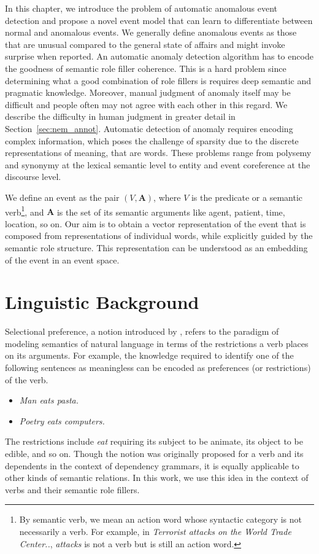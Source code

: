 In this chapter, we introduce the problem of automatic anomalous event
detection and propose a novel event model that can learn to differentiate
between normal
and anomalous events. We generally define anomalous events as those that are
unusual compared
to the general state of affairs and might invoke surprise when reported. An 
automatic
anomaly detection algorithm has to encode
the goodness of semantic role filler coherence.  This is a hard problem since
determining what a good combination of role fillers is 
requires deep semantic and pragmatic knowledge.  
Moreover, manual judgment of anomaly itself may be difficult and people often
may not agree with each other in this
regard.  We describe the difficulty in human judgment in greater detail in
Section~\ref{sec:nem_annot}.  
Automatic detection of anomaly requires encoding complex information, which
poses the challenge of sparsity
due to the discrete representations of meaning, that are words.  These problems
range from polysemy and synonymy at the 
lexical semantic level to entity and event coreference at the discourse level.

We define an event as the pair $(V, \textbf{A})$, where $V$
is the predicate or a semantic verb\footnote{By semantic verb, we mean an action 
word whose
syntactic category is not necessarily a verb.  
For example, in \textit{Terrorist attacks on the World Trade Center..},
\textit{attacks} is not a verb but is still an 
action word.}, and $\textbf{A}$ is the set of its semantic arguments like agent,
patient, time, location, so on. Our aim
is to obtain a vector representation of the event that is composed from
representations of individual words, while explicitly guided by the semantic
role structure. This representation can be understood as an embedding of the
event in an event space. 

\section{Linguistic Background} \label{sec:nem_background}
Selectional preference, a notion introduced by \cite{wilks1973preference}, 
refers to the paradigm of modeling semantics of
natural language in terms of the restrictions a verb places on its arguments. 
For example, the knowledge required to identify
one of the following sentences as meaningless can be encoded as preferences (or 
restrictions) of the verb.
\begin{itemize}
 \item[] \textit{Man eats pasta.}
 \item[] \textit{Poetry eats computers.}
\end{itemize}
The restrictions include \textit{eat} requiring its subject to be animate, its 
object to be edible, and so on. Though the
notion was originally proposed for a verb and its dependents in the context of 
dependency grammars, it is equally applicable to
other kinds of semantic relations. In this work,
we use this idea in the context of verbs and their semantic role fillers.


